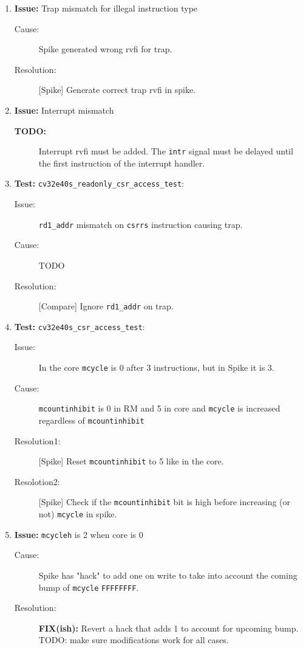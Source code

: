 \begin{enumerate}
\item \textbf{Issue:} Trap mismatch for illegal instruction type
  \begin{description}
    \item[Cause:] Spike generated wrong rvfi for trap.
    \item[Resolution:] [Spike] Generate correct trap rvfi in spike.
  \end{description}

\item \textbf{Issue:} Interrupt mismatch
  \begin{description}
    \item[\textbf{TODO:}] Interrupt rvfi must be added. The \lstinline{intr} signal must be delayed until the first instruction of the interrupt handler.
  \end{description}

\item \textbf{Test:} \lstinline{cv32e40s_readonly_csr_access_test}:
  \begin{description}
    \item[Issue:] \lstinline{rd1_addr} mismatch on \lstinline{csrrs} instruction causing trap.
    \item[Cause:] TODO
    \item[Resolution:] [Compare] Ignore \lstinline{rd1_addr} on trap.
  \end{description}

\item \textbf{Test:} \lstinline{cv32e40s_csr_access_test}:
  \begin{description}
    \item[Issue:] In the core \lstinline{mcycle} is 0 after 3 instructions, but in Spike it is 3.
    \item[Cause:] \lstinline{mcountinhibit} is 0 in RM and 5 in core and \lstinline{mcycle} is increased regardless of \lstinline{mcountinhibit}
    \item[Resolution1:] [Spike] Reset \lstinline{mcountinhibit} to 5 like in the core.
    \item[Resolotion2:] [Spike] Check if the \lstinline{mcountinhibit} bit is high before increasing (or not) \lstinline{mcycle} in spike.
  \end{description}

\item \textbf{Issue:} \lstinline{mcycleh} is 2 when core is 0
  \begin{description}
    \item[Cause:] Spike has "hack" to add one on write to take into account the coming bump of \lstinline{mcycle} \texttt{FFFFFFFF}.
    \item[Resolution:] \textbf{FIX(ish):} Revert a hack that adds 1 to account for upcoming bump. TODO: make sure modifications work for all cases.
  \end{description}


\end{enumerate}
